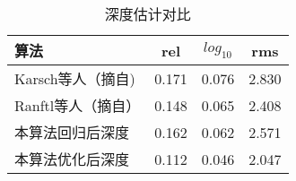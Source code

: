\begin{table}[h]
    \caption{深度估计对比}
    \label{tab:dmvosr_depth}
    \begin{center}
    \begin{tabular}{l c c c }
    \toprule
    算法 & rel & $log_{10}$ & rms \\
    \midrule
    Karsch等人\cite{karsch2014depth}（摘自\cite{ranftl2016dense})& 0.171&0.076&2.830\\
    Ranftl等人（摘自\cite{ranftl2016dense}）         & 0.148&0.065&2.408\\
    本算法回归后深度                    & 0.162&0.062&2.571\\
    本算法优化后深度                    & 0.112&0.046&2.047\\
    \bottomrule
    \end{tabular}
    \end{center}
 \end{table}
